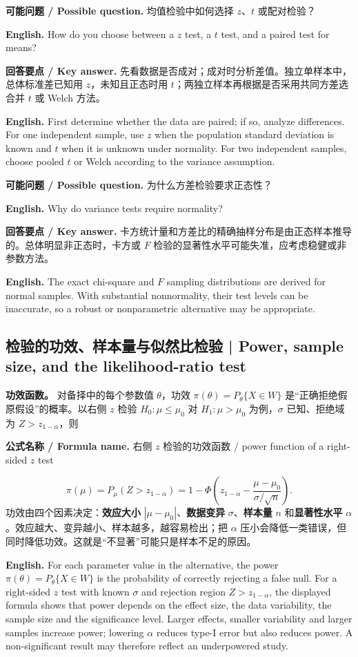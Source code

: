 \documentclass[UTF8,11pt,a4paper]{ctexart}
\newcommand{\EN}[1]{\par\noindent\textbf{English.} #1\par}
\newcommand{\FORMULA}[2]{\par\noindent\textbf{公式名称 / Formula name.} #1 / #2\par}
\newcommand{\ASK}[4]{\par\noindent\textbf{可能问题 / Possible question.} #1\par\EN{#2}\noindent\textbf{回答要点 / Key answer.} #3\par\EN{#4}\medskip}
\begin{document}
\ASK{均值检验中如何选择 $z$、$t$ 或配对检验？}{How do you choose between a $z$ test, a $t$ test, and a paired test for means?}{先看数据是否成对；成对时分析差值。独立单样本中，总体标准差已知用 $z$，未知且正态时用 $t$；两独立样本再根据是否采用共同方差选合并 $t$ 或 Welch 方法。}{First determine whether the data are paired; if so, analyze differences. For one independent sample, use $z$ when the population standard deviation is known and $t$ when it is unknown under normality. For two independent samples, choose pooled $t$ or Welch according to the variance assumption.}

\ASK{为什么方差检验要求正态性？}{Why do variance tests require normality?}{卡方统计量和方差比的精确抽样分布是由正态样本推导的。总体明显非正态时，卡方或 $F$ 检验的显著性水平可能失准，应考虑稳健或非参数方法。}{The exact chi-square and $F$ sampling distributions are derived for normal samples. With substantial nonnormality, their test levels can be inaccurate, so a robust or nonparametric alternative may be appropriate.}

\subsection*{检验的功效、样本量与似然比检验 | Power, sample size, and the likelihood-ratio test}
\noindent\textbf{功效函数。} 对备择中的每个参数值 $\theta$，功效 $\pi(\theta)=P_\theta\{X\in W\}$ 是“正确拒绝假原假设”的概率。以右侧 $z$ 检验 $H_0:\mu\le\mu_0$ 对 $H_1:\mu>\mu_0$ 为例，$\sigma$ 已知、拒绝域为 $Z>z_{1-\alpha}$，则
\FORMULA{右侧 $z$ 检验的功效函数}{power function of a right-sided $z$ test}
\[
\pi(\mu)=P_\mu\left(Z>z_{1-\alpha}\right)
=1-\Phi\!\left(z_{1-\alpha}-\frac{\mu-\mu_0}{\sigma/\sqrt n}\right).
\]
功效由四个因素决定：\textbf{效应大小} $|\mu-\mu_0|$、\textbf{数据变异} $\sigma$、\textbf{样本量} $n$ 和\textbf{显著性水平} $\alpha$。效应越大、变异越小、样本越多，越容易检出；把 $\alpha$ 压小会降低一类错误，但同时降低功效。这就是“不显著”可能只是样本不足的原因。
\EN{For each parameter value in the alternative, the power $\pi(\theta)=P_\theta\{X\in W\}$ is the probability of correctly rejecting a false null. For a right-sided $z$ test with known $\sigma$ and rejection region $Z>z_{1-\alpha}$, the displayed formula shows that power depends on the effect size, the data variability, the sample size and the significance level. Larger effects, smaller variability and larger samples increase power; lowering $\alpha$ reduces type-I error but also reduces power. A non-significant result may therefore reflect an underpowered study.}
\end{document}
